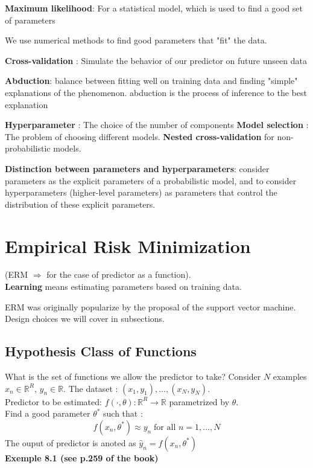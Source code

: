 \textbf{Maximum likelihood}: For a statistical model, which is used to find a good set of parameters

We use numerical methods to find good parameters that "fit" the data. 

\textbf{Cross-validation} : Simulate the behavior of our predictor on future unseen data

\textbf{Abduction}: balance between fitting well on training data and finding "simple" explanations of the phenomenon. abduction is the process of inference to the best explanation

\textbf{Hyperparameter} : The choice of the number of components
\textbf{Model selection} : The problem of choosing different models. \textbf{Nested cross-validation} for non-probabilistic models. 

\textbf{Distinction between parameters and hyperparameters}: consider parameters as the explicit parameters of a probabilistic model, and to consider hyperparameters (higher-level parameters) as parameters that control the distribution of these explicit parameters.

\section{Empirical Risk Minimization} 
(ERM $\Rightarrow$ for the case of predictor as a function).\\
\textbf{Learning} means estimating parameters based on training data.

ERM was originally popularize by the proposal of the support vector machine.\\
Design choices we will cover in subsections.

\subsection{Hypothesis Class of Functions}
What is the set of functions we allow the predictor to take?
Consider $\textit{N}$ examples $x_n \in \mathbb{R}^R$, $y_n \in \mathbb{R}$. The dataset : $(x_1, y_1),\dots,(x_N, y_N)$.\\
Predictor to be estimated: $f(\cdot,\theta): \mathbb{R}^R \to \mathbb{R}$ parametrized by $\theta$.\\
Find a good parameter $\theta^{*}$ such that :
\[
f(x_n,\theta^{*}) \approx y_n \; \text{for all } n = 1, \dots, N \tag{8.3}
\]
The ouput of predictor is anoted as $\hat{y}_n = f(x_n, \theta^{*})$\\
\textbf{Exemple 8.1 (see p.259 of the book)}
